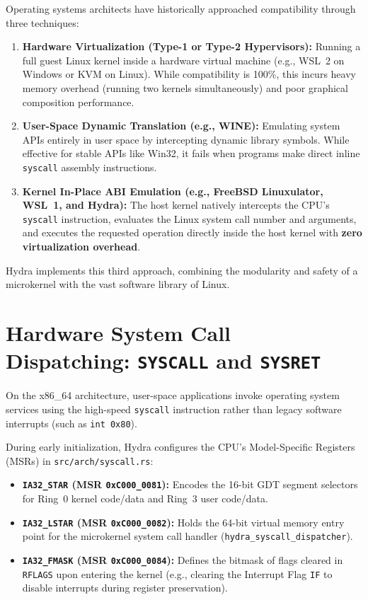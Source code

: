 Operating systems architects have historically approached compatibility through three techniques:
\begin{enumerate}
    \item \textbf{Hardware Virtualization (Type-1 or Type-2 Hypervisors):} Running a full guest Linux kernel inside a hardware virtual machine (e.g., WSL~2 on Windows or KVM on Linux). While compatibility is 100\%, this incurs heavy memory overhead (running two kernels simultaneously) and poor graphical composition performance.
    \item \textbf{User-Space Dynamic Translation (e.g., WINE):} Emulating system APIs entirely in user space by intercepting dynamic library symbols. While effective for stable APIs like Win32, it fails when programs make direct inline \texttt{syscall} assembly instructions.
    \item \textbf{Kernel In-Place ABI Emulation (e.g., FreeBSD Linuxulator, WSL~1, and Hydra):} The host kernel natively intercepts the CPU's \texttt{syscall} instruction, evaluates the Linux system call number and arguments, and executes the requested operation directly inside the host kernel with \textbf{zero virtualization overhead}.
\end{enumerate}

Hydra implements this third approach, combining the modularity and safety of a microkernel with the vast software library of Linux.

\section{Hardware System Call Dispatching: \texttt{SYSCALL} and \texttt{SYSRET}}
\label{sec:syscall_dispatch}

On the x86\_64 architecture, user-space applications invoke operating system services using the high-speed \texttt{syscall} instruction rather than legacy software interrupts (such as \texttt{int 0x80}).

During early initialization, Hydra configures the CPU's Model-Specific Registers (MSRs) in \texttt{src/arch/syscall.rs}:
\begin{itemize}
    \item \textbf{\texttt{IA32\_STAR} (MSR \texttt{0xC000\_0081}):} Encodes the 16-bit GDT segment selectors for Ring~0 kernel code/data and Ring~3 user code/data.
    \item \textbf{\texttt{IA32\_LSTAR} (MSR \texttt{0xC000\_0082}):} Holds the 64-bit virtual memory entry point for the microkernel system call handler (\texttt{hydra\_syscall\_dispatcher}).
    \item \textbf{\texttt{IA32\_FMASK} (MSR \texttt{0xC000\_0084}):} Defines the bitmask of flags cleared in \texttt{RFLAGS} upon entering the kernel (e.g., clearing the Interrupt Flag \texttt{IF} to disable interrupts during register preservation).
\end{itemize}

